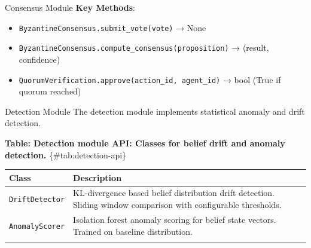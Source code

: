 \documentclass[
  ignorenonframetext,
]{beamer}
\newcounter{none} %
\providecommand{\tightlist}{%
  \setlength{\itemsep}{0pt}\setlength{\parskip}{0pt}}
\begin{document}
\begin{frame}[fragile]{Consensus Module}
\textbf{Key Methods}:

\begin{itemize}
\tightlist
\item
  \texttt{ByzantineConsensus.submit\_vote(vote)} → None
\item
  \texttt{ByzantineConsensus.compute\_consensus(proposition)} → (result,
  confidence)
\item
  \texttt{QuorumVerification.approve(action\_id,\ agent\_id)} → bool
  (True if quorum reached)
\end{itemize}
\end{frame}

\begin{frame}{Detection Module}
\protect{}\label{sec:detection-api}
The detection module implements statistical anomaly and drift detection.

\textbf{Table: Detection module API: Classes for belief drift and
anomaly detection.} \{\#tab:detection-api\}

{\def\LTcaptype{none} %
\begin{longtable}[]{@{}
  >{\raggedright\arraybackslash}p{}
  >{\raggedright\arraybackslash}p{}@{}}
\toprule\noalign{}
\begin{minipage}[b]{\linewidth}\raggedright
Class
\end{minipage} & \begin{minipage}[b]{\linewidth}\raggedright
Description
\end{minipage} \\
\midrule\noalign{}
\endhead
\texttt{DriftDetector} & KL-divergence based belief distribution drift
detection. Sliding window comparison with configurable thresholds. \\
\texttt{AnomalyScorer} & Isolation forest anomaly scoring for belief
state vectors. Trained on baseline distribution. \\
\bottomrule\noalign{}
\end{longtable}
}
\end{frame}
\end{document}
